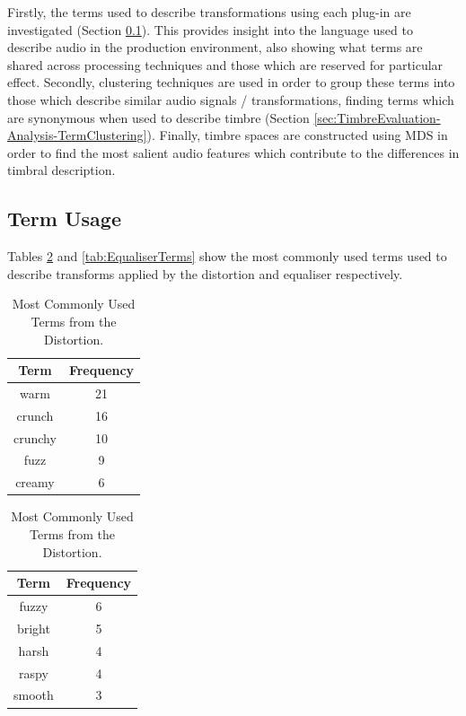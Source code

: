 	Firstly, the terms used to describe transformations using each plug-in are investigated (Section
	\ref{sec:TimbreEvaluation-Analysis-TermUsage}). This provides insight into the language used to describe audio in
	the production environment, also showing what terms are shared across processing techniques and those which are
	reserved for particular effect. Secondly, clustering techniques are used in order to group these terms into those
	which describe similar audio signals / transformations, finding terms which are synonymous when used to describe
	timbre (Section \ref{sec:TimbreEvaluation-Analysis-TermClustering}). Finally, timbre spaces are constructed using
	MDS in order to find the most salient audio features which contribute to the differences in timbral description.

	\subsection{Term Usage}
	\label{sec:TimbreEvaluation-Analysis-TermUsage}
		Tables \ref{tab:DistortionTerms} and \ref{tab:EqualiserTerms} show the most commonly used terms used to
		describe transforms applied by the distortion and equaliser respectively.

		\begin{table}[h!]
			\centering
			\begin{tabular}{|c|c|}
				\hline
				\bf{Term} & \bf{Frequency} \\
				\hline
				\hline
				warm & 21 \\
				\hline
				crunch & 16 \\
				\hline
				crunchy & 10 \\
				\hline
				fuzz & 9 \\
				\hline
				creamy & 6 \\
				\hline
			\end{tabular}
			\qquad
			\begin{tabular}{|c|c|}
				\hline
				\bf{Term} & \bf{Frequency} \\
				\hline
				\hline
				fuzzy & 6 \\
				\hline
				bright & 5 \\
				\hline
				harsh & 4 \\
				\hline
				raspy & 4 \\
				\hline
				smooth & 3 \\
				\hline
			\end{tabular}
			\caption{Most Commonly Used Terms from the Distortion.}
			\label{tab:DistortionTerms}
		\end{table}

